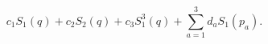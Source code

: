 \begin{equation}
c_1 S_1(q) + c_2 S_2(q) + c_3 S_1^3(q)+ \sum_{a=1}^3 d_a S_1(p_a).
\label{eqform}
\end{equation}

